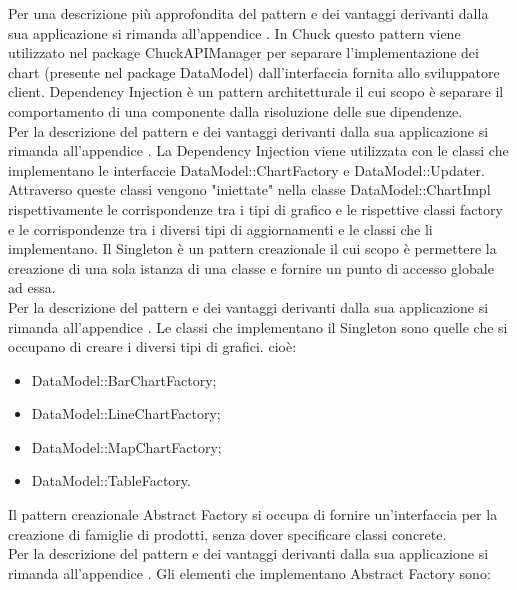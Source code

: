 			Per una descrizione più approfondita del pattern e dei vantaggi derivanti dalla sua applicazione si rimanda all'appendice .
				In Chuck questo pattern viene utilizzato nel package ChuckAPIManager per separare l'implementazione dei chart (presente nel package DataModel) dall'interfaccia fornita allo sviluppatore client.
			Dependency Injection è un pattern architetturale il cui scopo è separare il comportamento di una componente dalla risoluzione delle sue dipendenze.\\
			Per la descrizione del pattern e dei vantaggi derivanti dalla sua applicazione si rimanda all'appendice .
				La Dependency Injection viene utilizzata con le classi che implementano le interfaccie DataModel::ChartFactory e DataModel::Updater. Attraverso queste classi vengono "iniettate" nella classe DataModel::ChartImpl rispettivamente le corrispondenze tra i tipi di grafico e le rispettive classi factory e le corrispondenze tra i diversi tipi di aggiornamenti e le classi che li implementano.
	Il Singleton è un pattern creazionale il cui scopo è permettere la creazione di una sola istanza di una classe e fornire un punto di accesso globale ad essa.\\
	Per la descrizione del pattern e dei vantaggi derivanti dalla sua applicazione si rimanda all'appendice .
	Le classi che implementano il Singleton sono quelle che si occupano di creare i diversi tipi di grafici. cioè:
	\begin{itemize}
	\item DataModel::BarChartFactory;
	\item DataModel::LineChartFactory;
	\item DataModel::MapChartFactory;
	\item DataModel::TableFactory.
	\end{itemize}
	Il pattern creazionale Abstract Factory si occupa di fornire un'interfaccia per la creazione di famiglie di prodotti, senza dover specificare classi concrete. \\
	Per la descrizione del pattern e dei vantaggi derivanti dalla sua applicazione si rimanda all'appendice .
	Gli elementi che implementano Abstract Factory sono:
